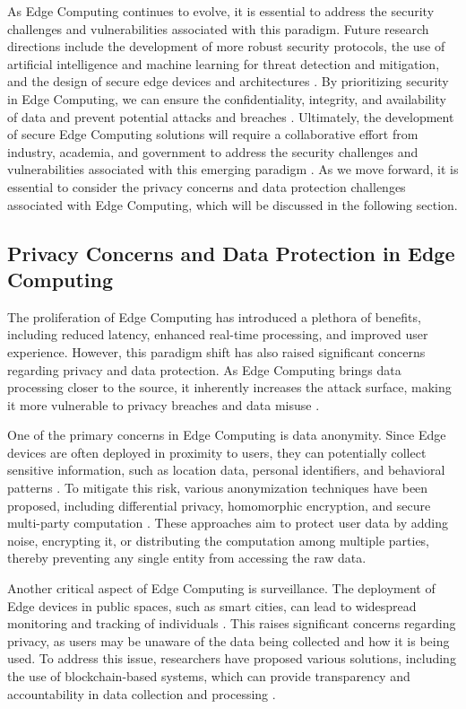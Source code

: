 \documentclass[11pt,a4paper]{article}
\begin{document}
As Edge Computing continues to evolve, it is essential to address the security challenges and vulnerabilities associated with this paradigm. Future research directions include the development of more robust security protocols, the use of artificial intelligence and machine learning for threat detection and mitigation, and the design of secure edge devices and architectures \cite{arxiv:2309.03420}. By prioritizing security in Edge Computing, we can ensure the confidentiality, integrity, and availability of data and prevent potential attacks and breaches \cite{arxiv:2407.08543}. Ultimately, the development of secure Edge Computing solutions will require a collaborative effort from industry, academia, and government to address the security challenges and vulnerabilities associated with this emerging paradigm \cite{arxiv:2509.12296}. As we move forward, it is essential to consider the privacy concerns and data protection challenges associated with Edge Computing, which will be discussed in the following section.


\subsection{Privacy Concerns and Data Protection in Edge Computing}


The proliferation of Edge Computing has introduced a plethora of benefits, including reduced latency, enhanced real-time processing, and improved user experience. However, this paradigm shift has also raised significant concerns regarding privacy and data protection. As Edge Computing brings data processing closer to the source, it inherently increases the attack surface, making it more vulnerable to privacy breaches and data misuse \cite{arxiv:1602.00484}. 

One of the primary concerns in Edge Computing is data anonymity. Since Edge devices are often deployed in proximity to users, they can potentially collect sensitive information, such as location data, personal identifiers, and behavioral patterns \cite{arxiv:1911.02794}. To mitigate this risk, various anonymization techniques have been proposed, including differential privacy, homomorphic encryption, and secure multi-party computation \cite{arxiv:2004.07311}. These approaches aim to protect user data by adding noise, encrypting it, or distributing the computation among multiple parties, thereby preventing any single entity from accessing the raw data.

Another critical aspect of Edge Computing is surveillance. The deployment of Edge devices in public spaces, such as smart cities, can lead to widespread monitoring and tracking of individuals \cite{arxiv:2211.01863}. This raises significant concerns regarding privacy, as users may be unaware of the data being collected and how it is being used. To address this issue, researchers have proposed various solutions, including the use of blockchain-based systems, which can provide transparency and accountability in data collection and processing \cite{arxiv:2109.12195}.
\end{document}
